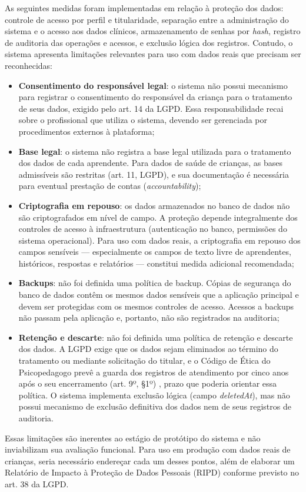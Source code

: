 As seguintes medidas foram implementadas em relação à proteção dos dados: controle de acesso por perfil e titularidade, separação entre a administração do sistema e o acesso aos dados clínicos, armazenamento de senhas por \textit{hash}, registro de auditoria das operações e acessos, e exclusão lógica dos registros. Contudo, o sistema apresenta limitações relevantes para uso com dados reais que precisam ser reconhecidas:

\begin{itemize}
    \item \textbf{Consentimento do responsável legal}: o sistema não possui mecanismo para registrar o consentimento do responsável da criança para o tratamento de seus dados, exigido pelo art. 14 da LGPD. Essa responsabilidade recai sobre o profissional que utiliza o sistema, devendo ser gerenciada por procedimentos externos à plataforma;
    \item \textbf{Base legal}: o sistema não registra a base legal utilizada para o tratamento dos dados de cada aprendente. Para dados de saúde de crianças, as bases admissíveis são restritas (art. 11, LGPD), e sua documentação é necessária para eventual prestação de contas (\textit{accountability});
    \item \textbf{Criptografia em repouso}: os dados armazenados no banco de dados não são criptografados em nível de campo. A proteção depende integralmente dos controles de acesso à infraestrutura (autenticação no banco, permissões do sistema operacional). Para uso com dados reais, a criptografia em repouso dos campos sensíveis — especialmente os campos de texto livre de aprendentes, históricos, respostas e relatórios — constitui medida adicional recomendada;
    \item \textbf{Backups}: não foi definida uma política de backup. Cópias de segurança do banco de dados contêm os mesmos dados sensíveis que a aplicação principal e devem ser protegidas com os mesmos controles de acesso. Acessos a backups não passam pela aplicação e, portanto, não são registrados na auditoria;
    \item \textbf{Retenção e descarte}: não foi definida uma política de retenção e descarte dos dados. A LGPD exige que os dados sejam eliminados ao término do tratamento ou mediante solicitação do titular, e o Código de Ética do Psicopedagogo prevê a guarda dos registros de atendimento por cinco anos após o seu encerramento (art. 9º, §1º) \cite{abpp2019_codigo_etica}, prazo que poderia orientar essa política. O sistema implementa exclusão lógica (campo \textit{deletedAt}), mas não possui mecanismo de exclusão definitiva dos dados nem de seus registros de auditoria.
\end{itemize}

Essas limitações são inerentes ao estágio de protótipo do sistema e não inviabilizam sua avaliação funcional. Para uso em produção com dados reais de crianças, seria necessário endereçar cada um desses pontos, além de elaborar um Relatório de Impacto à Proteção de Dados Pessoais (RIPD) conforme previsto no art. 38 da LGPD.